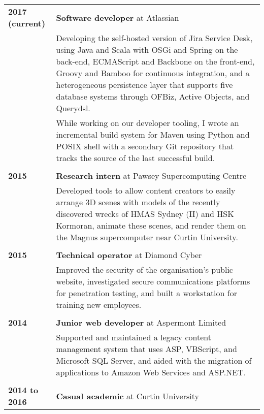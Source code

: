 \documentclass[a4paper,12pt]{article}
\begin{document}
\begin{tabular}{p{35mm}p{125mm}}
	                    \textbf{2017 (current)}     & \textbf{Software developer} at Atlassian
	\vspace{0.2em}  \\                              & Developing the self-hosted version of Jira Service Desk, using Java and Scala with OSGi and Spring on the back-end, ECMAScript and Backbone on the front-end, Groovy and Bamboo for continuous integration, and a heterogeneous persistence layer that supports five database systems through OFBiz, Active Objects, and Querydsl.
    \vspace{0.2em}  \\                              & While working on our developer tooling, I wrote an incremental build system for Maven using Python and POSIX shell with a secondary Git repository that tracks the source of the last successful build.
	\\              \\  \textbf{2015}               & \textbf{Research intern} at Pawsey Supercomputing Centre
	\vspace{0.2em}  \\                              & Developed tools to allow content creators to easily arrange 3D scenes with models of the recently discovered wrecks of HMAS Sydney (II) and HSK Kormoran, animate these scenes, and render them on the Magnus supercomputer near Curtin University.
	\\              \\  \textbf{2015}               & \textbf{Technical operator} at Diamond Cyber
	\vspace{0.2em}  \\                              & Improved the security of the organisation's public website, investigated secure communications platforms for penetration testing, and built a workstation for training new employees.
	\\              \\  \textbf{2014}               & \textbf{Junior web developer} at Aspermont Limited
	\vspace{0.2em}  \\                              & Supported and maintained a legacy content management system that uses ASP, VBScript, and Microsoft SQL Server, and aided with the migration of applications to Amazon Web Services and ASP.NET.
	\\              \\  \textbf{2014 to 2016}       & \textbf{Casual academic} at Curtin University

\end{tabular}
\end{document}
